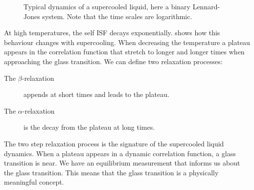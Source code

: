 \begin{figure}
	\centering
	\caption{Typical dynamics of a supercooled liquid, here a binary Lennard-Jones system. Note that the time scales are logarithmic.}
	\label{fig:dynamics_kob}
\end{figure}

At high temperatures, the self \ac{ISF} decays exponentially.  shows how this behaviour changes with supercooling. When decreasing the temperature a plateau appears in the correlation function that stretch to longer and longer times when approaching the glass transition. We can define two relaxation processes:
\begin{description}
	\item[The $\beta$-relaxation] appends at short times and leads to the plateau.
	\item[The $\alpha$-relaxation] is the decay from the plateau at long times.
\end{description}

The two step relaxation process is the signature of the supercooled liquid dynamics. When a plateau appears in a dynamic correlation function, a glass transition is near. We have an equilibrium measurement that informs us about the glass transition. This means that the glass transition is a physically meaningful concept.

